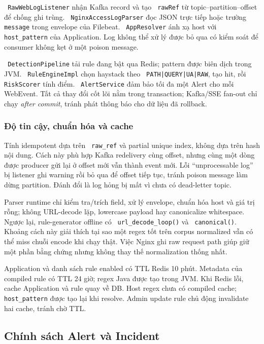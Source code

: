 \documentclass[runningheads]{report-template/llncs}
\newcommand{\code}[1]{\texttt{\small\hyphenchar\font=45 #1}}
\begin{document}
\code{RawWebLogListener} nhận Kafka record và tạo \code{rawRef} từ
topic--partition--offset để chống ghi trùng. \code{NginxAccessLogParser}
đọc JSON trực tiếp hoặc trường \code{message} trong envelope của Filebeat.
\code{AppResolver} ánh xạ host với \code{host\_pattern} của Application.
Log không thể xử lý được bỏ qua có kiểm soát để consumer không kẹt ở một
poison message.

\code{DetectionPipeline} tải rule đang bật qua Redis; pattern được biên
dịch trong JVM. \code{RuleEngineImpl} chọn haystack theo
\code{PATH|QUERY|UA|RAW}, tạo hit, rồi \code{RiskScorer} tính điểm.
\code{AlertService} đảm bảo tối đa một Alert cho mỗi WebEvent. Tất cả
thay đổi cốt lõi nằm trong transaction; Kafka/SSE fan-out chỉ chạy
\emph{after commit}, tránh phát thông báo cho dữ liệu đã rollback.

\subsubsection{Độ tin cậy, chuẩn hóa và cache}

Tính idempotent dựa trên \code{raw\_ref} và partial unique index, không
dựa trên hash nội dung. Cách này phù hợp Kafka redelivery cùng offset,
nhưng cùng một dòng được producer gửi lại ở offset mới vẫn thành event
mới. Lỗi ``unprocessable log'' bị listener ghi warning rồi bỏ qua để
offset tiếp tục, tránh poison message làm dừng partition. Đánh đổi là log
hỏng bị mất vì chưa có dead-letter topic.

Parser runtime chỉ kiểm tra/trích field, xử lý envelope, chuẩn hóa host
và giá trị rỗng; không URL-decode lặp, lowercase payload hay canonicalize
whitespace. Ngược lại, rule-generator offline có
\code{url\_decode\_loop()} và \code{canonical()}. Khoảng cách này giải
thích tại sao một regex tốt trên corpus normalized vẫn có thể miss chuỗi
encode khi chạy thật. Việc Nginx ghi raw request path giúp giữ một phần
bằng chứng nhưng không thay thế normalization thống nhất.

Application và danh sách rule enabled có TTL Redis 10 phút. Metadata của
compiled rule có TTL 24 giờ; regex Java được tạo trong JVM. Khi Redis
lỗi, cache Application và rule quay về DB. Host regex chưa có compiled
cache; \code{host\_pattern} được tạo lại khi resolve. Admin update rule
chủ động invalidate hai cache, tránh chờ TTL.

\subsection{Chính sách Alert và Incident}
\end{document}
